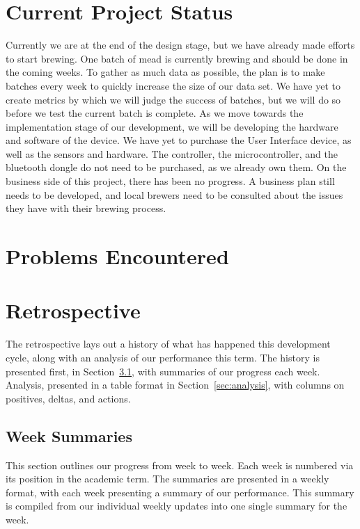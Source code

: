 \documentclass[draftclsnofoot,onecolumn,letterpaper,10pt]{IEEEtran}
\begin{document}
\section{Current Project Status}%
Currently we are at the end of the design stage, but we have already made efforts to start brewing.
One batch of mead is currently brewing and should be done in the coming weeks.
To gather as much data as possible, the plan is to make batches every week to quickly increase the size of our data set.
We have yet to create metrics by which we will judge the success of batches, but we will do so before we test the current batch is complete.
As we move towards the implementation stage of our development, we will be developing the hardware and software of the device.
We have yet to purchase the User Interface device, as well as the sensors and hardware.
The controller, the microcontroller, and the bluetooth dongle do not need to be purchased, as we already own them.
On the business side of this project, there has been no progress.
A business plan still needs to be developed, and local brewers need to be consulted about the issues they have with their brewing process.


\section{Problems Encountered}%

\section{Retrospective}
The retrospective lays out a history of what has happened this development cycle, along with an analysis of our performance this term.
The history is presented first, in Section~\ref{sec:weekSummaries}, with summaries of our progress each week.
Analysis, presented in a table format in Section~\ref{sec:analysis}, with columns on positives, deltas, and actions.

\subsection{Week Summaries}\label{sec:weekSummaries}
This section outlines our progress from week to week.
Each week is numbered via its position in the academic term.
The summaries are presented in a weekly format, with each week presenting a summary of our performance.
This summary is compiled from our individual weekly updates into one single summary for the week. %
\end{document}
